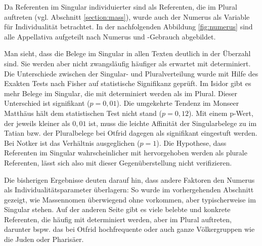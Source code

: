 Da Referenten im Singular individuierter sind als Referenten, die im Plural auftreten (vgl. Abschnitt \ref{section:mass}), wurde auch der Numerus als Variable für Individualität  betrachtet. In der nachfolgenden Abbildung \ref{fig:numerus} sind alle Appellativa aufgeteilt nach Numerus und -Gebrauch abgebildet.

Man sieht, dass die Belege im Singular in allen Texten deutlich in der Überzahl sind. Sie werden aber nicht zwangsläufig häufiger als erwartet mit  determiniert. Die Unterschiede zwischen der Singular- und Pluralverteilung wurde mit Hilfe des Exakten Tests nach Fisher auf statistische Signifikanz geprüft. Im Isidor gibt es mehr Belege im Singular, die mit  determiniert werden als im Plural. Dieser Unterschied ist signifikant ($p=0,01$). Die umgekehrte Tendenz im Monseer Matthäus hält dem statistischen Test nicht stand ($p=0,12$). Mit einem p-Wert,
der jeweils kleiner als $0,01$ ist, muss die leichte Affinität der Singularbelege zu  im Tatian bzw. der Pluralbelege bei Otfrid dagegen als signifikant eingestuft werden. Bei Notker ist das Verhältnis ausgeglichen ($p=1$). Die Hypothese, dass Referenten im
Singular wahrscheinlicher mit  hervorgehoben werden als plurale
Referenten, lässt sich also mit dieser Gegenüberstellung nicht verifizieren. 

Die bisherigen Ergebnisse deuten darauf hin, dass andere Faktoren den Numerus als Individualitätsparameter überlagern: So wurde im vorhergehenden Abschnitt gezeigt, wie Massennomen überwiegend ohne  vorkommen, aber typischerweise im Singular stehen. Auf der anderen Seite gibt es viele belebte und konkrete Referenten, die häufig mit  determiniert werden, aber im Plural auftreten, darunter bspw. das bei Otfrid hochfrequente   oder auch ganze Völkergruppen wie die Juden oder Pharisäer.

